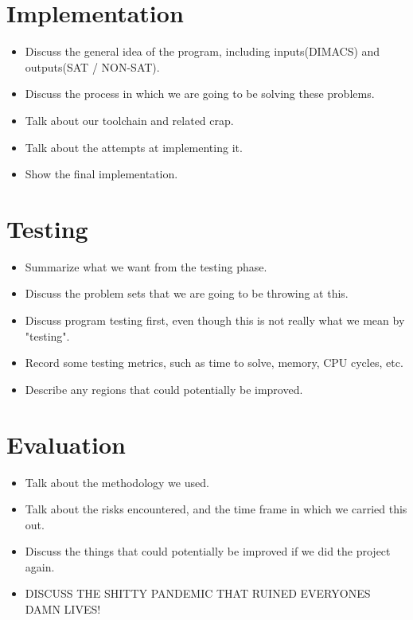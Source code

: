 \documentclass{article}
\begin{document}
\section{Implementation}
\begin{itemize}
    \item Discuss the general idea of the program, including inputs(DIMACS) and outputs(SAT / NON-SAT).
    \item Discuss the process in which we are going to be solving these problems.
    \item Talk about our toolchain and related crap.
    \item Talk about the attempts at implementing it.
    \item Show the final implementation.
\end{itemize}

\section{Testing}
\begin{itemize}
    \item Summarize what we want from the testing phase.
    \item Discuss the problem sets that we are going to be throwing at this.
    \item Discuss program testing first, even though this is not really what we mean by "testing".
    \item Record some testing metrics, such as time to solve, memory, CPU cycles, etc.
    \item Describe any regions that could potentially be improved.
\end{itemize}

\section{Evaluation}
\begin{itemize}
    \item Talk about the methodology we used.
    \item Talk about the risks encountered, and the time frame in which we carried this out.
    \item Discuss the things that could potentially be improved if we did the project again.
    \item DISCUSS THE SHITTY PANDEMIC THAT RUINED EVERYONES DAMN LIVES!
\end{itemize}
\end{document}
